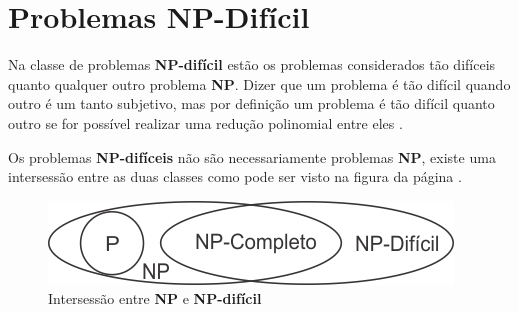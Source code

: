 \section{Problemas NP-Difícil}
Na classe de problemas \textbf{NP-difícil} estão os problemas considerados tão difíceis quanto qualquer outro problema \textbf{NP}. Dizer que um problema é tão difícil quando outro é um tanto subjetivo, mas por definição um problema é tão difícil quanto outro se for possível realizar uma redução polinomial entre eles \cite{HOPCROFT1974}.

Os problemas \textbf{NP-difíceis} não são necessariamente problemas \textbf{NP}, existe uma intersessão entre as duas classes como pode ser visto na figura da página \pageref{intersessao-np-npdificil}.

\begin{figure}
\centering
\label{intersessao-np-npdificil}
\includegraphics[scale=3]{./figuras/figNP.png}
\caption{Intersessão entre \textbf{NP} e \textbf{NP-difícil} \cite{VIEIRA2001}}
\end{figure}
